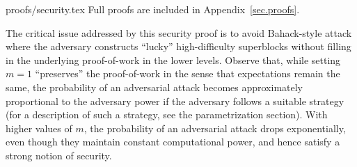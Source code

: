 \ifonecolumn
{proofs/security.tex}
\else
Full proofs are included in Appendix~\ref{sec.proofs}.
\fi

\begin{remark}
    \label{rmk.variance}
    The critical issue addressed by this security proof is to avoid Bahack-style
    attack \cite{bahack} where the adversary constructs ``lucky'' high-difficulty
    superblocks without filling in the underlying proof-of-work in the lower
    levels. Observe that, while setting $m = 1$ ``preserves'' the proof-of-work in
    the sense that expectations remain the same, the probability of an adversarial
    attack becomes approximately proportional to the adversary power if the
    adversary follows a suitable strategy (for a description of such a strategy,
    see the parametrization section). With higher values of $m$, the probability of
    an adversarial attack drops exponentially, even though they maintain constant
    computational power, and hence satisfy a strong notion of security.
\end{remark}
